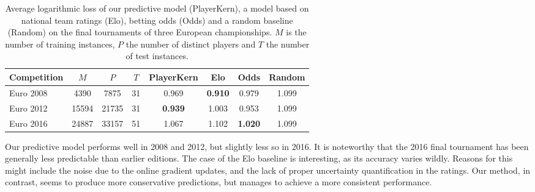 \begin{table}
  \caption{
  Average logarithmic loss of our predictive model (PlayerKern), a model based on national team ratings (Elo), betting odds (Odds) and a random baseline (Random) on the final tournaments of three European championships.
  $M$ is the number of training instances, $P$ the number of distinct players and $T$ the number of test instances.}
  \label{pk:tab:eval}
  \centering
  \begin{tabular}{
    l
    *{2}{S[table-format=5]}
    S[table-format=2]
    *{4}{S[table-format=1.3]}
  }
    \toprule
    Competition &   $M$ &   $P$ & $T$ &    {PlayerKern} &           {Elo} &          {Odds} & {Random} \\
    \midrule
    Euro 2008   &  4390 &  7875 &  31 &           0.969 & \bfseries 0.910 &           0.979 &    1.099 \\
    Euro 2012   & 15594 & 21735 &  31 & \bfseries 0.939 &           1.003 &           0.953 &    1.099 \\
    Euro 2016   & 24887 & 33157 &  51 &           1.067 &           1.102 & \bfseries 1.020 &    1.099 \\
    \bottomrule
  \end{tabular}
\end{table}

Our predictive model performs well in 2008 and 2012, but slightly less so in 2016.
It is noteworthy that the 2016 final tournament has been generally less predictable than earlier editions.
The case of the Elo baseline is interesting, as its accuracy varies wildly.
Reasons for this might include the noise due to the online gradient updates, and the lack of proper uncertainty quantification in the ratings.
Our method, in contrast, seems to produce more conservative predictions, but manages to achieve a more consistent performance.
